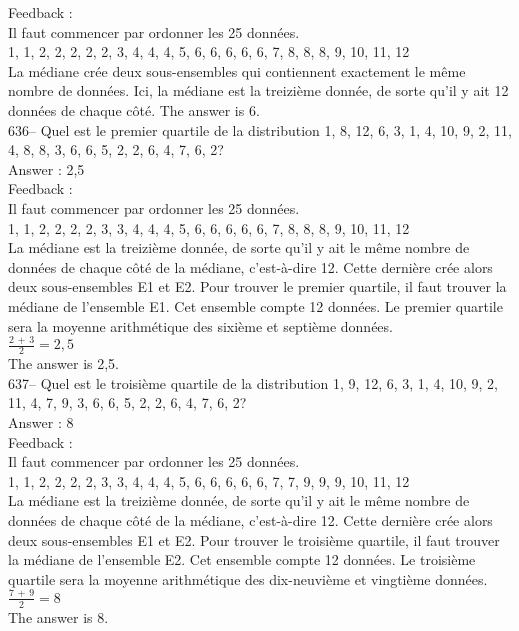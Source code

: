 ﻿\documentclass[letterpaper, 12pt]{article}
\begin{document}
Feedback : \\
Il faut commencer par ordonner les 25 donn\'ees.\\
1, 1, 2, 2, 2, 2, 2, 3, 4, 4, 4, 5, 6, 6, 6, 6, 6, 7, 8, 8, 8, 9, 10, 11,
12\\
La m\'ediane cr\'ee deux sous-ensembles qui contiennent exactement le m\^eme
nombre de donn\'ees.  Ici, la m\'ediane est la treizi\`eme donn\'ee, de
sorte qu'il y ait 12 donn\'ees de chaque c\^ot\'e.  The answer is 6.\\

636--  Quel est le premier quartile de la distribution 1, 8, 12, 6, 3, 1, 4,
10, 9, 2, 11, 4, 8, 8, 3, 6, 6, 5, 2, 2, 6, 4, 7, 6, 2?\\

Answer : 2,5\\

Feedback : \\
Il faut commencer par ordonner les 25 donn\'ees.\\
1, 1, 2, 2, 2, 2, 3, 3, 4, 4, 4, 5, 6, 6, 6, 6, 6, 7, 8, 8, 8, 9, 10, 11,
12\\
La m\'ediane est la treizi\`eme donn\'ee, de sorte qu'il y ait le m\^eme
nombre de donn\'ees de chaque c\^ot\'e de la m\'ediane, c'est-\`a-dire 12.
Cette derni\`ere cr\'ee alors deux sous-ensembles E1 et E2.  Pour trouver le
premier quartile, il faut trouver la m\'ediane de l'ensemble E1.  Cet
ensemble compte 12 donn\'ees.  Le premier quartile sera la moyenne
arithm\'etique des sixi\`eme et septi\`eme donn\'ees.  \\[2mm]
$\frac{2\,+\,3}{2}=2,5$\\[2mm]
The answer is 2,5.\\

637--  Quel est le troisi\`eme quartile de la distribution 1, 9, 12, 6, 3,
1, 4, 10, 9, 2, 11, 4, 7, 9, 3, 6, 6, 5, 2, 2, 6, 4, 7, 6, 2?\\

Answer : 8\\

Feedback : \\
Il faut commencer par ordonner les 25 donn\'ees.\\
1, 1, 2, 2, 2, 2, 3, 3, 4, 4, 4, 5, 6, 6, 6, 6, 6, 7, 7, 9, 9, 9, 10, 11,
12\\
La m\'ediane est la treizi\`eme donn\'ee, de sorte qu'il y ait le m\^eme
nombre de donn\'ees de chaque c\^ot\'e de la m\'ediane, c'est-\`a-dire 12.
Cette derni\`ere cr\'ee alors deux sous-ensembles E1 et E2.  Pour trouver le
troisi\`eme quartile, il faut trouver la m\'ediane de l'ensemble E2.  Cet
ensemble compte 12 donn\'ees.  Le troisi\`eme quartile sera la moyenne
arithm\'etique des dix-neuvi\`eme et vingti\`eme donn\'ees.  \\[2mm]
$\frac{7\,+\,9}{2}=8$\\[2mm]
The answer is 8.\\
\end{document}
